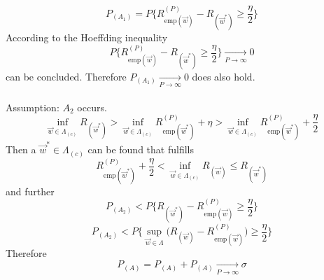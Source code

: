 \begin{equation} \label{15}
	P_{(A_1)} = 
		P\Big\{ R_{\mathrm{emp}(\vec{w})}^{(P)} - 
			R_{(\vec{w}^*)}
			\geq \frac{\eta}{2} 
		\Big\}
\end{equation}
According to the Hoeffding inequality 
\begin{equation} \label{16}
	P\Big\{ R_{\mathrm{emp}(\vec{w})}^{(P)} - 
		R_{(\vec{w}^*)}
		\geq \frac{\eta}{2} 
		\Big\}
	\xrightarrow[P \rightarrow \infty]{} 0
\end{equation}
can be concluded. Therefore $P_{ (A_1) } \xrightarrow[P \rightarrow \infty]{} 0$ does also hold.\\\\
Assumption: $A_2$ occurs.
\begin{equation} \label{17}
	\inf_{ \vec{w} \in \Lambda_{ (c) } } R_{ (\vec{w}^*) } 
	> \inf_{ \vec{w} \in \Lambda_{ (c) } } 
			R_{ \mathrm{emp}(\vec{w}^*) }^{(P)} + \eta
	> \inf_{ \vec{w} \in \Lambda_{ (c) } } 
			R_{ \mathrm{emp}(\vec{w}^*) }^{(P)} + 
			\frac{\eta}{2}
\end{equation}
Then a $\vec{w}^* \in \Lambda_{(c)}$ can be found that fulfills
\begin{equation} \label{18}
	R_{\mathrm{emp}(\vec{w}^*)}^{(P)} + \frac{\eta}{2}
	< 	\inf_{\vec{w} \in \Lambda_{(c)}} R_{(\vec{w})}
	\leq 	R_{(\vec{w}^*)}
\end{equation}
and further
\begin{equation} \label{19}
	P_{(A_2)} < P\Big\{
		R_{(\vec{w}^*)}- R_{\mathrm{emp}(\vec{w})}^{(P)}
	\geq \frac{\eta}{2} \Big\}
\end{equation}
\begin{equation} \label{20}
	P_{(A_2)} < P\Big\{
		\sup_{ \vec{w} \in \Lambda } 
			\Big( R_{(\vec{w})} 
			- R_{\mathrm{emp}(\vec{w})}^{(P)}
			\Big)
			\geq \frac{\eta}{2} \Big\}
\end{equation}
Therefore
\begin{equation} \label{21}
	P_{ (A) } = P_{ (A) } + P_{ (A) } 
		\xrightarrow[P \rightarrow \infty]{} \sigma
\end{equation}
